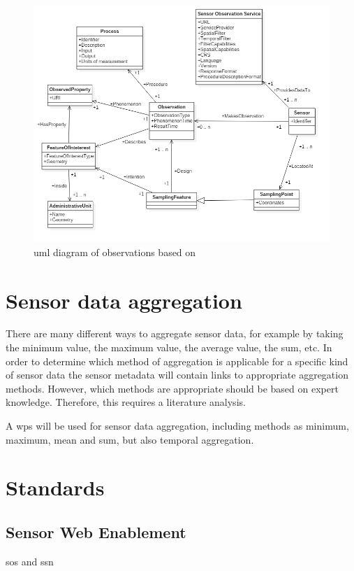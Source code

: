 \begin{figure}
	\centering
	\includegraphics[width=1\linewidth]{figs/UML_Diagram.png}
	\caption{\ac{uml} diagram of observations based on \cite{SSW:Cox3}}
	\label{fig:UML}
\end{figure}

\section{Sensor data aggregation}
There are many different ways to aggregate sensor data, for example by taking the minimum value, the maximum value, the average value, the sum, etc. In order to determine which method of aggregation is applicable for a specific kind of sensor data the sensor metadata will contain links to appropriate aggregation methods. However, which methods are appropriate should be based on expert knowledge. Therefore, this requires a literature analysis. 


\iffalse

A \ac{wps} will be used for sensor data aggregation, including methods as minimum, maximum, mean and sum, but also temporal aggregation. 


\section{Standards}
\subsection{Sensor Web Enablement}
\ac{sos} and \ac{ssn}

